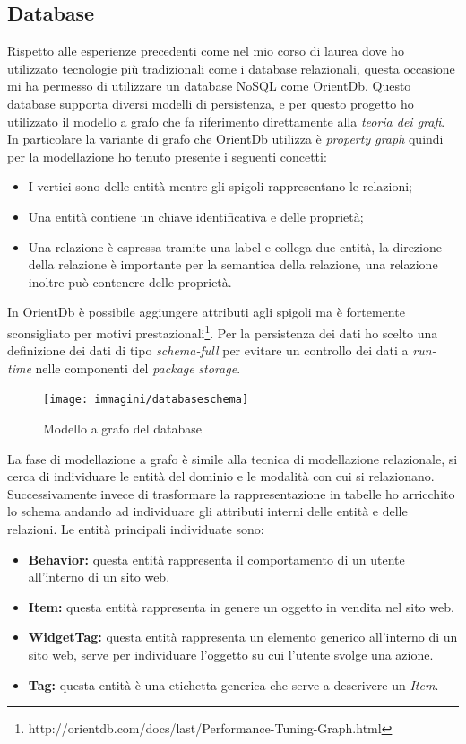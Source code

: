 \subsection{Database}
Rispetto alle esperienze precedenti come nel mio corso di laurea dove ho utilizzato tecnologie più tradizionali come i database relazionali, questa occasione mi ha permesso di utilizzare un database NoSQL come OrientDb. Questo database supporta diversi modelli di persistenza, e per questo progetto ho utilizzato il modello a grafo che fa riferimento direttamente alla \emph{teoria dei grafi}. In particolare la variante di grafo che OrientDb utilizza è \emph{property graph} quindi per la modellazione ho tenuto presente i seguenti concetti:
\begin{itemize}
\item I vertici sono delle entità mentre gli spigoli rappresentano le relazioni;
\item Una entità contiene un chiave identificativa e delle proprietà; 
\item Una relazione è espressa tramite una label e collega due entità, la direzione della relazione è importante per la semantica della relazione, una relazione inoltre può contenere delle proprietà.
\end{itemize}
In OrientDb è possibile aggiungere attributi agli spigoli ma è fortemente sconsigliato per motivi prestazionali\footnote{http://orientdb.com/docs/last/Performance-Tuning-Graph.html}. Per la persistenza dei dati ho scelto una definizione dei dati di tipo \emph{schema-full} per evitare un controllo dei dati a \emph{run-time} nelle componenti del \emph{package} \emph{storage}.
\newpage
\begin{figure}[h]
\centering
\texttt{[image: immagini/databaseschema]}
\caption{Modello a grafo del database}
\label{fig:database-schema}
\end{figure}
La fase di modellazione a grafo è simile alla tecnica di modellazione relazionale, si cerca di individuare le entità del dominio e le modalità con cui si relazionano. Successivamente invece di trasformare la rappresentazione in tabelle ho arricchito lo schema andando ad individuare gli attributi interni delle entità e delle relazioni.
Le entità principali individuate sono:
\begin{itemize}
\item \textbf{Behavior:} questa entità rappresenta il comportamento di un utente all'interno di un sito web.
\item \textbf{Item:} questa entità rappresenta in genere un oggetto in vendita nel sito web.
\item \textbf{WidgetTag:} questa entità rappresenta un elemento generico all'interno di un sito web, serve per individuare l'oggetto su cui l'utente svolge una azione. %
\item \textbf{Tag:} questa entità è una etichetta generica che serve a descrivere un \emph{Item}.
\end{itemize}
